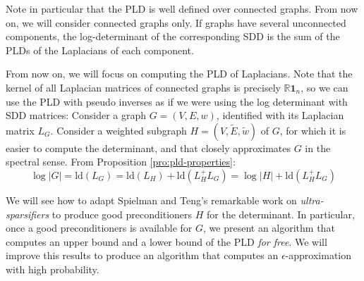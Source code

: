 Note in particular that the PLD is well defined over connected graphs.
From now on, we will consider connected graphs only. If graphs have
several unconnected components, the log-determinant of the corresponding
SDD is the sum of the PLDs of the Laplacians of each component. 

From now on, we will focus on computing the PLD of Laplacians. Note
that the kernel of all Laplacian matrices of connected graphs is precisely
$\mathbb{R}\mathbf{1}_{n}$, so we can use the PLD with pseudo inverses
as if we were using the log determinant with SDD matrices: Consider
a graph $G=\left(V,E,w\right)$, identified with its Laplacian matrix
$L_{G}$. Consider a weighted subgraph $H=\left(V,\tilde{E},\tilde{w}\right)$
of $G$, for which it is easier to compute the determinant, and that
closely approximates $G$ in the spectral sense. From Proposition
\ref{pro:pld-properties}: 
\[
\log\left|G\right|=\text{ld}\left(L_{G}\right)=\text{ld}\left(L_{H}\right)+\text{ld}\left(L_{H}^{+}L_{G}\right)=\log\left|H\right|+\text{ld}\left(L_{H}^{+}L_{G}\right)
\]


We will see how to adapt Spielman and Teng's remarkable work on \emph{ultra-sparsifiers}
to produce good preconditioners $H$ for the determinant. In particular,
once a good preconditioners is available for $G$, we present an algorithm
that computes an upper bound and a lower bound of the PLD \emph{for
free}. We will improve this results to produce an algorithm that computes
an $\epsilon$-approximation with high probability.

